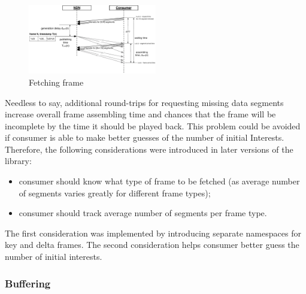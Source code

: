 \documentclass{icn/sig-alternate-2012} %
\begin{document}
\begin{figure}[t!]
\centering
\includegraphics[width=0.5\textwidth]{frame-fetch}
\vspace{-18pt}
\caption{Fetching frame}
\label{fig:pull}
\end{figure}

Needless to say, additional round-trips for requesting missing data segments increase overall frame assembling time and chances that the frame will be incomplete by the time it should be played back. This problem could be avoided if consumer is able to make better guesses of the number of initial Interests. Therefore, the following considerations were introduced in later versions of the library:
\begin{itemize}
\item consumer should know what type of frame to be fetched (as average number of segments varies greatly for different frame types);
\item consumer should track average number of segments per frame type.
\end{itemize}

The first consideration was implemented by introducing separate namespaces for key and delta frames. The second consideration helps consumer better guess the number of initial interests.

\subsubsection{Buffering}

\end{document}
